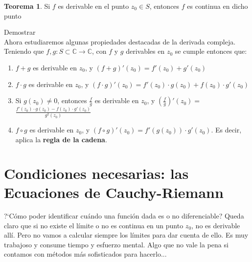 \documentclass[12pt]{article}
\theoremstyle{definition}
\theoremstyle{theorem}
\newtheorem{theorem}{Teorema}[section]
\theoremstyle{corolary}
\begin{document}
\colorbox{orange!40!white!80}{\parbox{\linewidth}{
\theoremstyle{theorem}
\begin{theorem}

 Si $f$ es derivable en el punto $z_0 \in S$, entonces $f$ es continua en dicho punto%

\end{theorem}}}
\linebreak

Demostrar\\

Ahora estudiaremos algunas propiedades destacadas de la derivada compleja. Teniendo que $f, g: S \subset \mathbb{C} \rightarrow \mathbb{C}$, con $f$ y $g$ derivables en $z_0$ se cumple entonces que:
\begin{enumerate}
	\item $f + g$ es derivable en $z_0$, y $(f+g)'(z_0) = f'(z_0) + g'(z_0)$
	\item $f \cdot g$ es derivable en $z_0$, y $(f\cdot g)'(z_0) = f'(z_0) \cdot g(z_0) + f(z_0) \cdot g'(z_0)$
	\item Si $g(z_0) \neq 0$, entonces \mbox{\Large$\frac{f} {g}$} es derivable en $z_0$, y \mbox{\Large$\left(\frac{f}{g}\right)'$}$(z_0) =$ \mbox{\Large$\frac{f'(z_0)\cdot g(z_0)-f(z_0)\cdot g'(z_0)}{g^2(z_0)}$}
	\item $f \circ g$ es derivable en $z_0$, y $(f \circ g)'(z_0) = f'(g(z_0))\cdot g'(z_0)$. Es decir, aplica la \textbf{regla de la cadena}.
\end{enumerate}

\section{Condiciones necesarias: las Ecuaciones de Cauchy-Riemann}
?`C\'omo poder identificar cu\'ando una funci\'on dada es o no diferenciable? Queda claro que si no existe el l\'imite o no es continua en un punto $z_0$, no es derivable all\'i. Pero no vamos a calcular siempre los l\'imites para dar cuenta de ello. Es muy trabajoso y consume tiempo y esfuerzo mental. Algo que no vale la pena si contamos con m\'etodos m\'as sofisticados para hacerlo...\\
\end{document}
